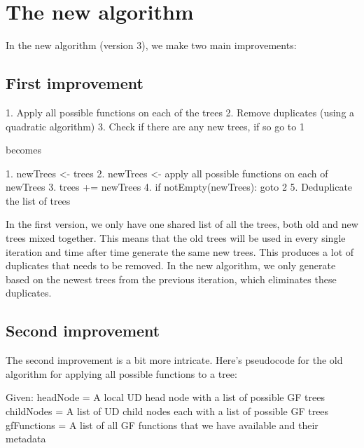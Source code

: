 \chapter{The new algorithm}


In the new algorithm (version 3), we make two main improvements:

\section{First improvement}

1. Apply all possible functions on each of the trees
2. Remove duplicates (using a quadratic algorithm)
3. Check if there are any new trees, if so go to 1

becomes

1. newTrees <- trees
2. newTrees <- apply all possible functions on each of newTrees
3. trees += newTrees
4. if notEmpty(newTrees): goto 2
5. Deduplicate the list of trees

In the first version, we only have one shared list of all the trees, both old and new trees mixed together. This means that the old trees will be used in every single iteration and time after time generate the same new trees. This produces a lot of duplicates that needs to be removed. In the new algorithm, we only generate based on the newest trees from the previous iteration, which eliminates these duplicates.



\section{Second improvement}

The second improvement is a bit more intricate. Here's pseudocode for the old algorithm for applying all possible functions to a tree:

Given:
headNode = A local UD head node with a list of possible GF trees
childNodes = A list of UD child nodes each with a list of possible GF trees
gfFunctions = A list of all GF functions that we have available and their metadata

